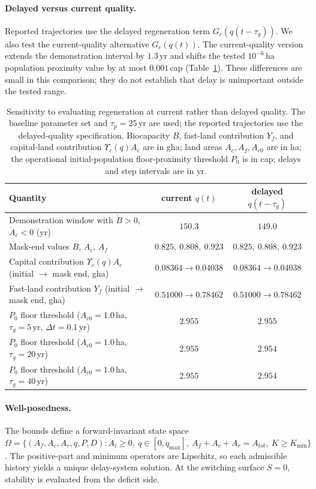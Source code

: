 \documentclass[11pt,a4paper]{article}
\newcommand{\Ups}{\Upsilon_c}
\begin{document}
\paragraph{Delayed versus current quality.} Reported trajectories use the delayed regeneration term $G_c(q(t-\tau_g))$. We also test the current-quality alternative $G_c(q(t))$. The current-quality version extends the demonstration interval by $1.3$\,yr and shifts the tested $10^{-6}$\,ha population proximity value by at most $0.001$\,cap (Table~\ref{tab:si_delay}). These differences are small in this comparison; they do not establish that delay is unimportant outside the tested range.

\begin{table}[htbp]
\centering\small
\caption{Sensitivity to evaluating regeneration at current rather than delayed quality. The baseline parameter set and $\tau_p=25$\,yr are used; the reported trajectories use the delayed-quality specification. Biocapacity $B$, fast-land contribution $Y_f$, and capital-land contribution $\Ups(q)A_c$ are in gha; land areas $A_c,A_f,A_{c0}$ are in ha; the operational initial-population floor-proximity threshold $P_0$ is in cap; delays and step intervals are in yr.}
\label{tab:si_delay}
\begin{tabularx}{\textwidth}{>{\raggedright\arraybackslash}Xcc}
\toprule
Quantity & current $q(t)$ & delayed $q(t-\tau_g)$ \\
\midrule
Demonstration window with $\dot B>0$, $\dot A_c<0$ (yr) & $150.3$ & $149.0$ \\
Mask-end values $B$, $A_c$, $A_f$ & $0.825,\ 0.808,\ 0.923$ & $0.825,\ 0.808,\ 0.923$ \\
Capital contribution $\Ups(q)A_c$ (initial $\to$ mask end, gha) & $0.08364\to0.04038$ & $0.08364\to0.04038$ \\
Fast-land contribution $Y_f$ (initial $\to$ mask end, gha) & $0.51000\to0.78462$ & $0.51000\to0.78462$ \\
$P_0$ floor threshold ($A_{c0}=1.0$\,ha, $\tau_g=5$\,yr, $\Delta t=0.1$\,yr) & $2.955$ & $2.955$ \\
$P_0$ floor threshold ($A_{c0}=1.0$\,ha, $\tau_g=20$\,yr) & $2.955$ & $2.954$ \\
$P_0$ floor threshold ($A_{c0}=1.0$\,ha, $\tau_g=40$\,yr) & $2.955$ & $2.954$ \\
\bottomrule
\end{tabularx}
\end{table}

\paragraph{Well-posedness.} The bounds define a forward-invariant state space $\Omega=\{(A_f,A_c,A_r,q,P,D):A_i\ge0,\ q\in[0,q_{\max}],\ A_f+A_c+A_r=A_{tot},\ K\ge K_{\min}\}$. The positive-part and minimum operators are Lipschitz, so each admissible history yields a unique delay-system solution. At the switching surface $S=0$, stability is evaluated from the deficit side.
\end{document}
